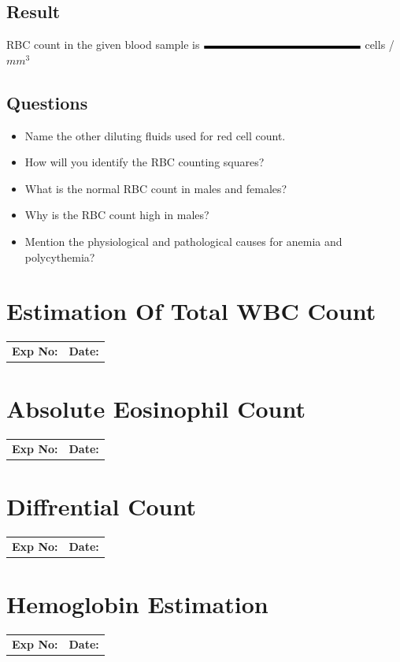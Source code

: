 \documentclass[a4paper,12pt]{book}
\begin{document}
\section*{Result}
RBC  count in the given  blood sample is $\rule{5cm}{0.1cm}$ cells / $mm^3$
\section*{Questions}
\begin{itemize}
\item {Name the other diluting fluids used for red  cell count.}
\item{How will you identify the RBC counting squares?}
\item{What is the normal RBC count in males and females?}
\item{Why is the RBC count high in males?}
\item{Mention the physiological and pathological causes for anemia and polycythemia?}


\end{itemize}

\chapter*{\centering Estimation Of Total WBC Count}

		\begin{tabular}{p{5in} p{1in}}
			\textbf{Exp No:}  & \textbf{Date:}\\
		\end{tabular}

\chapter*{\centering Absolute Eosinophil Count}

		\begin{tabular}{p{5in} p{1in}}
			\textbf{Exp No:}  & \textbf{Date:}\\
		\end{tabular}

\chapter*{\centering Diffrential Count}
		\begin{tabular}{p{5in} p{1in}}
			\textbf{Exp No:}  & \textbf{Date:}\\
		\end{tabular}

\chapter*{\centering Hemoglobin Estimation}
		\begin{tabular}{p{5in} p{1in}}
			\textbf{Exp No:}  & \textbf{Date:}\\
		\end{tabular}
\end{document}
